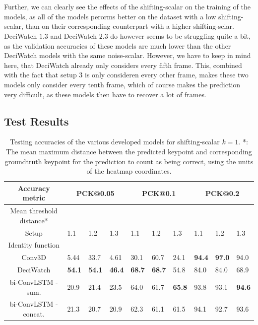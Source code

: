 \documentclass[./main.tex]{subfiles}
\begin{document}
\\
\\
Further, we can clearly see the effects of the shifting-scalar on the training of the models, as all of the models perorms better on the dataset with a low shifting-scalar, than on their corresponding counterpart with a higher shifting-sclar. DeciWatch $1.3$ and DeciWatch $2.3$ do however seems to be struggling quite a bit, as the validation accuracies of these models are much lower than the other DeciWatch models with the same noise-scalar. However, we have to keep in mind here, that DeciWatch already only considers every fifth frame. This, combined with the fact that setup $3$ is only consideren every other frame, makes these two models only consider every tenth frame, which of course makes the prediction very difficult, as these models then have to recover a lot of frames.

\subsection{Test Results}
\begin{table}[htbp]
    \begin{tabular}{c||lll|lll|lll}
        \hline
        Accuracy metric & \multicolumn{3}{c}{PCK@0.05} & \multicolumn{3}{c}{PCK@0.1} & \multicolumn{3}{c}{PCK@0.2} \\
        \hline
        Mean threshold distance* & \multicolumn{3}{c}{} & \multicolumn{3}{c}{} & \multicolumn{3}{c}{} \\
        \hline
        Setup & 1.1 & 1.2 & 1.3 & 1.1 & 1.2 & 1.3 & 1.1 & 1.2 & 1.3 \\
        \hline
        \hline
        Identity function & & & & & & & & & \\
        Conv3D & 5.44 & 33.7 & 4.61 & 30.1 & 60.7 & 24.1 & \textbf{94.4} & \textbf{97.0} & 94.0 \\
        DeciWatch & \textbf{54.1} & \textbf{54.1} & \textbf{46.4} & \textbf{68.7} & \textbf{68.7} & 54.8 & 84.0 & 84.0 & 68.9 \\
        bi-ConvLSTM - sum. & 20.9 & 21.4 & 23.5 & 64.0 & 61.7 & \textbf{65.8} & 93.8 & 93.1 & \textbf{94.6} \\
        bi-ConvLSTM - concat. & 21.3 & 20.7 & 20.9 & 62.3 & 61.1 & 61.5 & 94.1 & 92.7 & 93.6 \\
        \hline
    \end{tabular}
    \caption{Testing accuracies of the various developed models for shifting-scalar $k = 1$. *: The mean maximum distance between the predicted keypoint and corresponding groundtruth keypoint for the prediction to count as being correct, using the units of the heatmap coordinates.}
    \label{tab:pretrain_test_accs_1}
\end{table}
\end{document}
